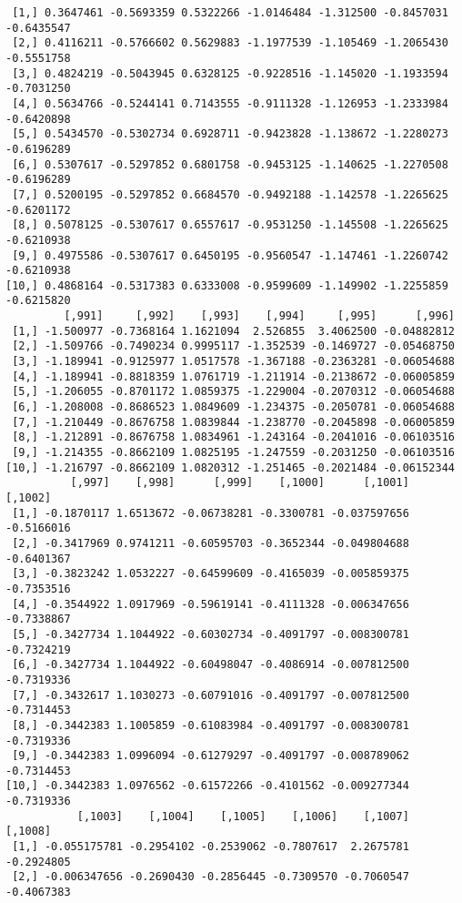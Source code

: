 \documentclass[
  letterpaper,
  DIV=11,
  numbers=noendperiod]{scrreprt}
\begin{document}
\begin{verbatim}
 [1,] 0.3647461 -0.5693359 0.5322266 -1.0146484 -1.312500 -0.8457031 -0.6435547
 [2,] 0.4116211 -0.5766602 0.5629883 -1.1977539 -1.105469 -1.2065430 -0.5551758
 [3,] 0.4824219 -0.5043945 0.6328125 -0.9228516 -1.145020 -1.1933594 -0.7031250
 [4,] 0.5634766 -0.5244141 0.7143555 -0.9111328 -1.126953 -1.2333984 -0.6420898
 [5,] 0.5434570 -0.5302734 0.6928711 -0.9423828 -1.138672 -1.2280273 -0.6196289
 [6,] 0.5307617 -0.5297852 0.6801758 -0.9453125 -1.140625 -1.2270508 -0.6196289
 [7,] 0.5200195 -0.5297852 0.6684570 -0.9492188 -1.142578 -1.2265625 -0.6201172
 [8,] 0.5078125 -0.5307617 0.6557617 -0.9531250 -1.145508 -1.2265625 -0.6210938
 [9,] 0.4975586 -0.5307617 0.6450195 -0.9560547 -1.147461 -1.2260742 -0.6210938
[10,] 0.4868164 -0.5317383 0.6333008 -0.9599609 -1.149902 -1.2255859 -0.6215820
         [,991]     [,992]    [,993]    [,994]     [,995]      [,996]
 [1,] -1.500977 -0.7368164 1.1621094  2.526855  3.4062500 -0.04882812
 [2,] -1.509766 -0.7490234 0.9995117 -1.352539 -0.1469727 -0.05468750
 [3,] -1.189941 -0.9125977 1.0517578 -1.367188 -0.2363281 -0.06054688
 [4,] -1.189941 -0.8818359 1.0761719 -1.211914 -0.2138672 -0.06005859
 [5,] -1.206055 -0.8701172 1.0859375 -1.229004 -0.2070312 -0.06054688
 [6,] -1.208008 -0.8686523 1.0849609 -1.234375 -0.2050781 -0.06054688
 [7,] -1.210449 -0.8676758 1.0839844 -1.238770 -0.2045898 -0.06005859
 [8,] -1.212891 -0.8676758 1.0834961 -1.243164 -0.2041016 -0.06103516
 [9,] -1.214355 -0.8662109 1.0825195 -1.247559 -0.2031250 -0.06103516
[10,] -1.216797 -0.8662109 1.0820312 -1.251465 -0.2021484 -0.06152344
          [,997]    [,998]      [,999]    [,1000]      [,1001]    [,1002]
 [1,] -0.1870117 1.6513672 -0.06738281 -0.3300781 -0.037597656 -0.5166016
 [2,] -0.3417969 0.9741211 -0.60595703 -0.3652344 -0.049804688 -0.6401367
 [3,] -0.3823242 1.0532227 -0.64599609 -0.4165039 -0.005859375 -0.7353516
 [4,] -0.3544922 1.0917969 -0.59619141 -0.4111328 -0.006347656 -0.7338867
 [5,] -0.3427734 1.1044922 -0.60302734 -0.4091797 -0.008300781 -0.7324219
 [6,] -0.3427734 1.1044922 -0.60498047 -0.4086914 -0.007812500 -0.7319336
 [7,] -0.3432617 1.1030273 -0.60791016 -0.4091797 -0.007812500 -0.7314453
 [8,] -0.3442383 1.1005859 -0.61083984 -0.4091797 -0.008300781 -0.7319336
 [9,] -0.3442383 1.0996094 -0.61279297 -0.4091797 -0.008789062 -0.7314453
[10,] -0.3442383 1.0976562 -0.61572266 -0.4101562 -0.009277344 -0.7319336
           [,1003]    [,1004]    [,1005]    [,1006]    [,1007]    [,1008]
 [1,] -0.055175781 -0.2954102 -0.2539062 -0.7807617  2.2675781 -0.2924805
 [2,] -0.006347656 -0.2690430 -0.2856445 -0.7309570 -0.7060547 -0.4067383

\end{verbatim}
\end{document}
